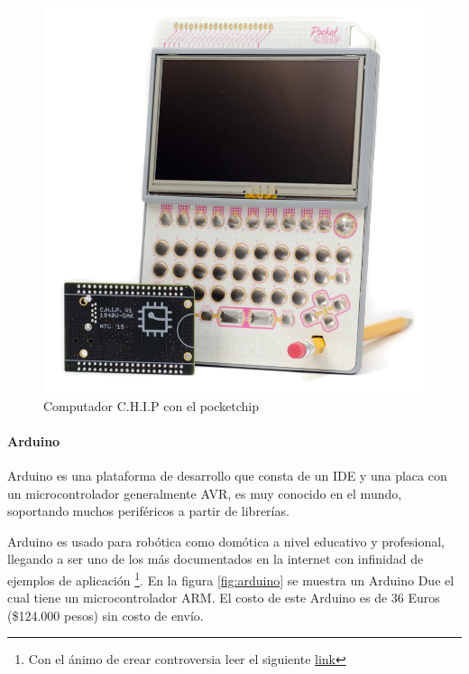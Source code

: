 \documentclass{article}
\begin{document}
\begin{figure}[hptp]
    \centering
    \includegraphics[scale=0.25]{imag/chip.png}
    \caption{Computador C.H.I.P con el pocketchip}
    \label{fig:chip}
\end{figure}
\smallskip

\paragraph{Arduino}

Arduino es una plataforma de desarrollo que consta de un IDE y una placa
con un microcontrolador generalmente  AVR, es muy conocido en el mundo,
soportando muchos periféricos a partir de librerías.

Arduino es usado para robótica como domótica a nivel educativo y 
profesional, llegando a ser uno de los más documentados en la internet con 
infinidad de ejemplos de aplicación
\footnote{Con el ánimo de crear controversia leer el siguiente 
 \href{http://dignal.com/porque-arduino-no-es-la-herramienta-correcta/}{link}
}. En la figura \ref{fig:arduino} se muestra un Arduino Due el cual tiene
un microcontrolador ARM. El costo de este Arduino es de 36 Euros (\$124.000
pesos) sin costo de envío.
\end{document}
